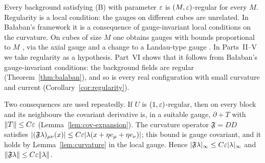 Every background satisfying (B) with parameter $\varepsilon$ is $(M,\varepsilon)$-regular for every $M$. Regularity is a local condition: the gauges on different cubes are unrelated. In Ba\l aban's framework it is a consequence of gauge-invariant local conditions on the curvature. On cubes of size $M$ one obtains gauges with bounds proportional to $M$ \cite[(3.35)--(3.36)]{BalBackground}, via the axial gauge and a change to a Landau-type gauge \cite[Theorem~2]{BalReg}. In Parts~II--V we take regularity as a hypothesis. Part~VI shows that it follows from Ba\l aban's gauge-invariant conditions: the background fields are regular (Theorem~\ref{thm:balaban}), and so is every real configuration with small curvature and current (Corollary~\ref{cor:regularity}).

Two consequences are used repeatedly. If $U$ is $(1,\varepsilon)$-regular, then on every block and its neighbours the covariant derivative is, in a suitable gauge, $\partial+T$ with $\|T\|\le C\varepsilon$ (Lemma~\ref{lem:cov-expansion}). The curvature operator $\mathfrak F=DD$ satisfies $|(\mathfrak F\lambda)_{\mu\nu}(x)|\le C\varepsilon|\lambda(x+\eta e_\mu+\eta e_\nu)|$; this bound is gauge covariant, and it holds by Lemma~\ref{lem:curvature} in the local gauge. Hence $|\mathfrak F\lambda|_\infty\le C\varepsilon|\lambda|_\infty$ and $\|\mathfrak F\lambda\|\le C\varepsilon\|\lambda\|$.

